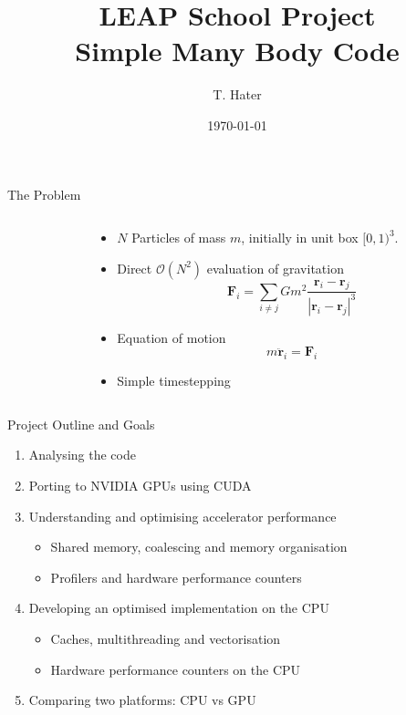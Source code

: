\documentclass{beamer}
\title{LEAP School Project\\ Simple Many Body Code}
\author{T. Hater}
\institute{FZJ | JSC | PADC}
\date{\today}
\begin{document}
\begin{frame}[fragile]{The Problem}
    \begin{columns}
    \begin{column}{0.35\textwidth}
    \end{column}
    \begin{column}{0.45\textwidth}
      \begin{itemize}
      \item $N$ Particles of mass $m$, initially
        in unit box $[0,1)^3$.
      \item Direct $\mathcal{O}(N^2)$ evaluation of gravitation 
        \begin{equation*}
          \mathbf{F}_i = \sum_{i\neq j} Gm^2\frac{\mathbf{r}_i - \mathbf{r}_j}{|\mathbf{r}_i - \mathbf{r}_j|^3}
        \end{equation*}
      \item Equation of motion 
        \begin{equation*}
          m\ddot{\mathbf{r}}_i = \mathbf{F}_i
        \end{equation*}
      \item Simple timestepping
      \end{itemize}
    \end{column}
  \end{columns}
\end{frame}

\begin{frame}{Project Outline and Goals}
  \begin{enumerate}
  \item Analysing the code
  \item Porting to NVIDIA GPUs using CUDA
  \item Understanding and optimising accelerator performance
    \begin{itemize}
    \item Shared memory, coalescing and memory organisation
    \item Profilers and hardware performance counters
    \end{itemize}
  \item Developing an optimised implementation on the CPU
    \begin{itemize}
    \item Caches, multithreading and vectorisation
    \item Hardware performance counters on the CPU
    \end{itemize}
  \item Comparing two platforms: CPU vs GPU
  \end{enumerate}
\end{frame}
\end{document}
